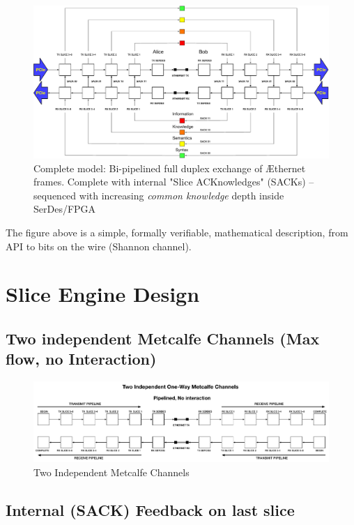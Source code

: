\documentclass[../HFT-main.tex]{subfiles}
\begin{document}
\begin{figure}
\includegraphics[width=\textwidth]{../figures/Full-Duplex-Bi-Pipelined.pdf}
  \caption{Complete model: Bi-pipelined full duplex exchange of  Æthernet frames. Complete with internal "Slice ACKnowledges" (SACKs) -- sequenced with increasing \emph{common knowledge} depth inside SerDes/FPGA}
\end{figure}

The figure above is a simple, formally verifiable, mathematical description, from API to bits on the wire (Shannon channel). 

\section{Slice Engine Design}

\subsection{Two independent Metcalfe Channels (Max flow, no Interaction)}

\begin{figure}
\includegraphics[width=\textwidth]{../figures/Two-Independent-Metcalfe.pdf}
  \caption{Two Independent Metcalfe Channels}
\end{figure}

\subsection{Internal (SACK) Feedback on last slice}
\end{document}

